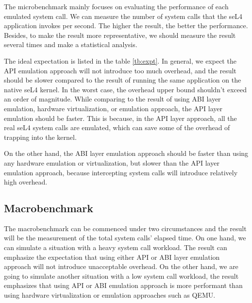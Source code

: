 The microbenchmark mainly focuses on evaluating the performance of each emulated system call. We can measure the number of system calls that the seL4 application invokes per second. The higher the result, the better the performance. Besides, to make the result more representative, we should measure the result several times and make a statistical analysis.

The ideal expectation is listed in the table \ref{tb:expt}. In general, we expect the API emulation approach will not introduce too much overhead, and the result should be slower compared to the result of running the same application on the native seL4 kernel. In the worst case, the overhead upper bound shouldn't exceed an order of magnitude. While comparing to the result of using ABI layer emulation, hardware virtualization, or emulation approach, the API layer emulation should be faster. This is because, in the API layer approach, all the real seL4 system calls are emulated, which can save some of the overhead of trapping into the kernel.  

On the other hand, the ABI layer emulation approach should be faster than using any hardware emulation or virtualization, but slower than the API layer emulation approach, because intercepting system calls will introduce relatively high overhead.   

\subsection{Macrobenchmark}

The macrobenchmark can be commenced under two circumstances and the result will be the measurement of the total system calls' elapsed time. On one hand, we can simulate a situation with a heavy system call workload. The result can emphasize the expectation that using either API or ABI layer emulation approach will not introduce unacceptable overhead. On the other hand, we are going to simulate another situation with a low system call workload, the result emphasizes that using API or ABI emulation approach is more performant than using hardware virtualization or emulation approaches such as QEMU.